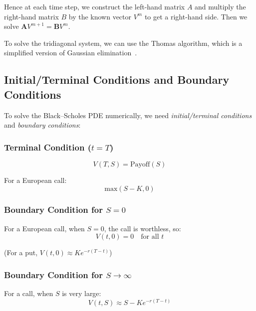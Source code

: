     Hence at each time step, we construct the left-hand matrix $A$ and multiply the right-hand matrix $B$ by the known
    vector $V^m$ to get a right-hand side.
    Then we solve $\textbf{A} V^{m+1} = \textbf{B} V^m$.

    To solve the tridiagonal system, we can use the Thomas algorithm,
    which is a simplified version of Gaussian elimination~\cite{tavella_pricing_2000}.

    \subsection{Initial/Terminal Conditions and Boundary Conditions}
    \label{sec:conditions}

    To solve the Black–Scholes PDE numerically, we need \textit{initial/terminal conditions} and \textit{boundary conditions}:

    \subsubsection{Terminal Condition ($t = T$)}
        \begin{equation}
            V(T, S) = \text{Payoff}(S)
            \label{eq:terminal_condition}
        \end{equation}

        For a European call:
        \begin{equation*}
            \text{max}(S - K, 0)
        \end{equation*}

    \subsubsection{Boundary Condition for $S = 0$}
        For a European call, when $S = 0$, the call is worthless, so:
        \begin{equation}
            V(t, 0) = 0 \quad \text{for all } t
            \label{eq:boundary_s0}
        \end{equation}

        (For a put, $V(t, 0) \approx Ke^{-r(T-t)}$)

    \subsubsection{Boundary Condition for $S \to \infty$}
        For a call, when $S$ is very large:
        \begin{equation*}
            V(t, S) \approx S - Ke^{-r(T-t)}
        \end{equation*}


